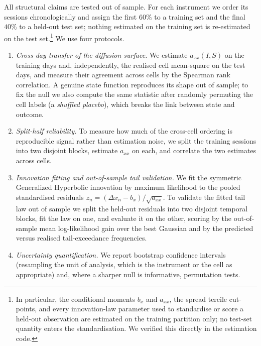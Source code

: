 \documentclass[11pt]{article}
\theoremstyle{plain}
\theoremstyle{definition}
\newcommand{\axx}{a_{xx}}
\begin{document}
All structural claims are tested out of sample. For each instrument we order its
sessions chronologically and assign the first $60\%$ to a training set and the
final $40\%$ to a held-out test set; nothing estimated on the training set is
re-estimated on the test set.\footnote{In particular, the conditional moments $b_x$ and
$\axx$, the spread tercile cut-points, and every innovation-law parameter used to
standardise or score a held-out observation are estimated on the training partition only;
no test-set quantity enters the standardisation. We verified this directly in the estimation
code.} We use four protocols.
\begin{enumerate}
  \item \emph{Cross-day transfer of the diffusion surface.} We estimate $\axx(I,S)$
  on the training days and, independently, the realised cell mean-square on the test
  days, and measure their agreement across cells by the Spearman rank correlation.
  A genuine state function reproduces its shape out of sample; to fix the null we
  also compute the same statistic after randomly permuting the cell labels (a
  \emph{shuffled placebo}), which breaks the link between state and outcome.
  \item \emph{Split-half reliability.} To measure how much of the cross-cell
  ordering is reproducible signal rather than estimation noise, we split the
  training sessions into two disjoint blocks, estimate $\axx$ on each, and correlate
  the two estimates across cells.
  \item \emph{Innovation fitting and out-of-sample tail validation.} We fit the
  symmetric Generalized Hyperbolic innovation by maximum likelihood to the pooled
  standardised residuals $z_n=(\Delta x_n - b_x)/\sqrt{\axx}$. To validate the
  fitted tail law out of sample we split the held-out residuals into two disjoint
  temporal blocks, fit the law on one, and evaluate it on the other, scoring by the
  out-of-sample mean log-likelihood gain over the best Gaussian and by the predicted
  versus realised tail-exceedance frequencies.
  \item \emph{Uncertainty quantification.} We report bootstrap confidence intervals
  (resampling the unit of analysis, which is the instrument or the cell as
  appropriate) and, where a sharper null is informative, permutation tests.
\end{enumerate}
\end{document}
